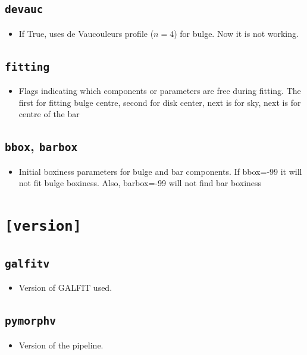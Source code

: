 \documentclass[11pt]{article}
\begin{document}
\subsection{\texttt{devauc}}
\begin{itemize}
\item If True, uses de Vaucouleurs profile ($n=4$) for bulge. Now it is not working.
\end{itemize}

\subsection{\texttt{fitting}}
\begin{itemize}
\item Flags indicating which components or parameters are free during fitting.
The first for fitting bulge centre, second for disk center, next is for sky, next is for centre of the bar
\end{itemize}

\subsection{\texttt{bbox}, \texttt{barbox}}
\begin{itemize}
\item Initial boxiness parameters for bulge and bar components. If bbox=-99 it will not fit bulge boxiness. Also, barbox=-99 will not find bar boxiness
\end{itemize}

\section{\texttt{[version]}}

\subsection{\texttt{galfitv}}
\begin{itemize}
\item Version of GALFIT used.
\end{itemize}

\subsection{\texttt{pymorphv}}
\begin{itemize}
\item Version of the pipeline.
\end{itemize}
\end{document}
